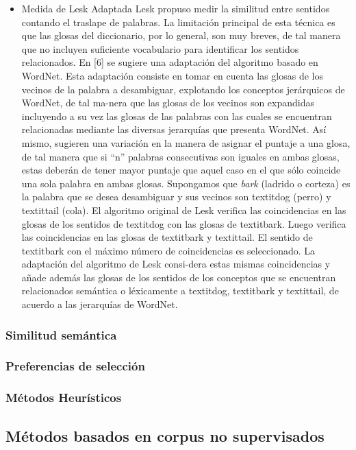 \begin{itemize}
  \item Medida de Lesk Adaptada
    Lesk propuso medir la similitud entre sentidos contando el traslape de palabras. La limitación principal de esta técnica es que las glosas del diccionario, por lo general, son muy breves, de tal manera que no incluyen suficiente vocabulario para identificar los sentidos relacionados. En [6] se sugiere una adaptación del algoritmo basado en WordNet. Esta adaptación consiste en tomar en cuenta las glosas de los vecinos de la palabra a desambiguar, explotando los conceptos jerárquicos de WordNet, de tal ma-nera que las glosas de los vecinos son expandidas incluyendo a su vez las glosas de las palabras con las cuales se encuentran relacionadas mediante las diversas jerarquías que presenta WordNet. Así mismo, sugieren una variación en la manera de asignar el puntaje a una glosa, de tal manera que si “n” palabras consecutivas son iguales en ambas glosas, estas deberán de tener mayor puntaje que aquel caso en el que sólo coincide una sola palabra en ambas glosas. 
    Supongamos que \textit{bark} (ladrido o corteza) es la palabra que se desea desambiguar y sus vecinos son textit{dog} (perro) y textit{tail} (cola). El algoritmo original de Lesk verifica las coincidencias en las glosas de los sentidos de textit{dog} con las glosas de textit{bark}. Luego verifica las coincidencias en las glosas de textit{bark} y textit{tail}. El sentido de textit{bark} con el máximo número de coincidencias es seleccionado. La adaptación del algoritmo de Lesk consi-dera estas mismas coincidencias y añade además las glosas de los sentidos de los conceptos que se encuentran relacionados semántica o léxicamente a textit{dog}, textit{bark} y textit{tail}, de acuerdo a las jerarquías de WordNet.
\end{itemize}

\subsubsection{Similitud semántica}
\subsubsection{Preferencias de selección}
\subsubsection{Métodos Heurísticos}
\subsection{Métodos basados en corpus no supervisados}
